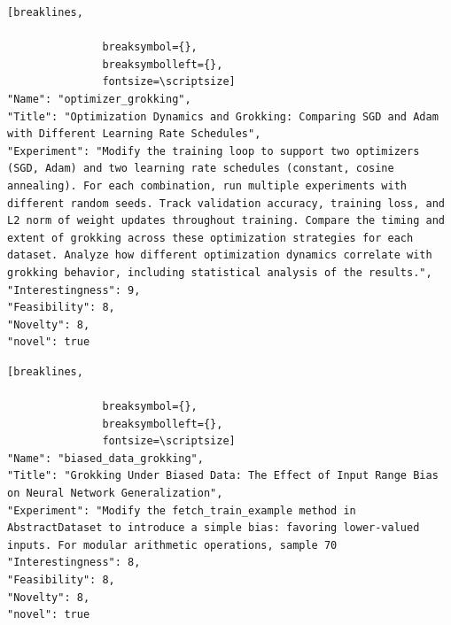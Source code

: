 \begin{tcolorbox}[
  breakable,
  colback  = blue!5!white,
  colframe = blue!75!black,
  title    = {Idea 2/50 - \texttt{optimizer\_grokking}},
  fontupper=\scriptsize\ttfamily,
]
\begin{Verbatim}[breaklines,

               breaksymbol={},
               breaksymbolleft={},
               fontsize=\scriptsize]
"Name": "optimizer_grokking",
"Title": "Optimization Dynamics and Grokking: Comparing SGD and Adam with Different Learning Rate Schedules",
"Experiment": "Modify the training loop to support two optimizers (SGD, Adam) and two learning rate schedules (constant, cosine annealing). For each combination, run multiple experiments with different random seeds. Track validation accuracy, training loss, and L2 norm of weight updates throughout training. Compare the timing and extent of grokking across these optimization strategies for each dataset. Analyze how different optimization dynamics correlate with grokking behavior, including statistical analysis of the results.",
"Interestingness": 9,
"Feasibility": 8,
"Novelty": 8,
"novel": true
\end{Verbatim}
\end{tcolorbox}

\begin{tcolorbox}[
  breakable,
  colback  = blue!5!white,
  colframe = blue!75!black,
  title    = {Idea 3/50 - \texttt{biased\_data\_grokking}},
  fontupper=\scriptsize\ttfamily,
]
\begin{Verbatim}[breaklines,

               breaksymbol={},
               breaksymbolleft={},
               fontsize=\scriptsize]
"Name": "biased_data_grokking",
"Title": "Grokking Under Biased Data: The Effect of Input Range Bias on Neural Network Generalization",
"Experiment": "Modify the fetch_train_example method in AbstractDataset to introduce a simple bias: favoring lower-valued inputs. For modular arithmetic operations, sample 70
"Interestingness": 8,
"Feasibility": 8,
"Novelty": 8,
"novel": true
\end{Verbatim}
\end{tcolorbox}


